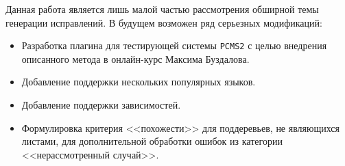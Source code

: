 \documentclass[specification,annotation]{itmo-student-thesis}
\begin{document}
Данная работа является лишь малой частью рассмотрения обширной темы генерации исправлений. В будущем возможен ряд серьезных
модификаций:
\begin{itemize}
    \item Разработка плагина для тестирующей системы \texttt{PCMS2} с целью внедрения описанного метода в онлайн-курс
        Максима Буздалова.
    \item Добавление поддержки нескольких популярных языков.
    \item Добавление поддержки зависимостей.
    \item Формулировка критерия <<похожести>> для поддеревьев, не являющихся листами, для дополнительной обработки ошибок из
        категории <<нерассмотренный случай>>.
\end{itemize}


\printmainbibliography
\end{document}
